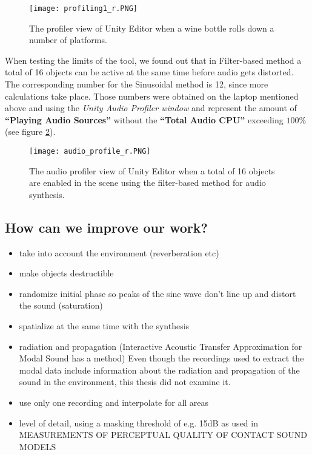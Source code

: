 \begin{figure}[H]
  \centering
    \texttt{[image: profiling1\_r.PNG]}
      \caption{The profiler view of Unity\textsuperscript{\textregistered} Editor when a wine bottle rolls down a number of platforms.}
      \label{fig:profile}
\end{figure} 

When testing the limits of the tool, we found out that in Filter-based method a total of 16 objects can be active at the same time before audio gets distorted. The corresponding number for the Sinusoidal method is 12, since more calculations take place. Those numbers were obtained on the laptop mentioned above and using the \textit{Unity\textsuperscript{\textregistered} Audio Profiler window} and represent the amount of \textbf{``Playing Audio Sources''} without the \textbf{``Total Audio CPU''} exceeding $100\%$ (see figure \ref{fig:audio_profile}).

\begin{figure}[H]
  \centering
    \texttt{[image: audio\_profile\_r.PNG]}
      \caption{The audio profiler view of Unity\textsuperscript{\textregistered} Editor when a total of 16 objects are enabled in the scene using the filter-based method for audio synthesis.}
      \label{fig:audio_profile}
\end{figure}

\subsection{How can we improve our work?}
\begin{itemize}
\item take into account the environment (reverberation etc)
\item make objects destructible
\item randomize initial phase so peaks of the sine wave don't line up and distort the sound (saturation)
\item spatialize at the same time with the synthesis
\item radiation and propagation (Interactive Acoustic Transfer Approximation for Modal Sound has a method)
Even though the recordings used to extract the modal data include information about the radiation and propagation of the sound in the environment, this thesis did not examine it.
\item use only one recording and interpolate for all areas
\item level of detail, using a masking threshold of e.g. 15dB as used in MEASUREMENTS OF PERCEPTUAL QUALITY OF CONTACT SOUND MODELS
\end{itemize}

